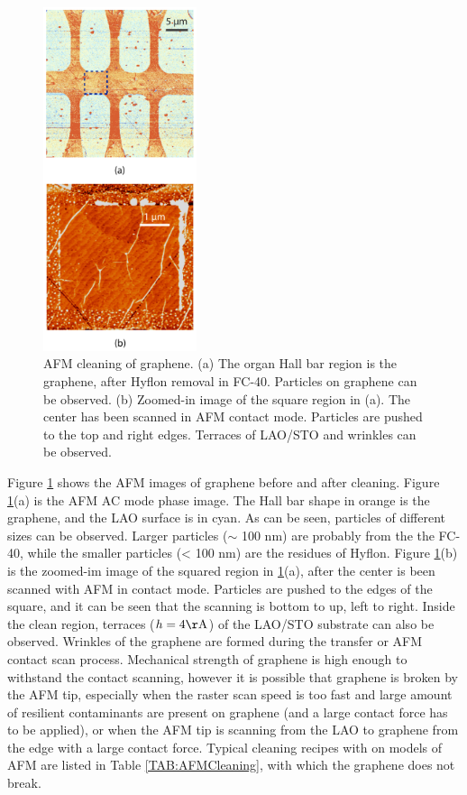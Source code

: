 \documentclass[pdflatex, sectionletters, 12pt]{pittetd}    %
\begin{document}
\begin{figure}[p]
	\centering
	\includegraphics[width=0.4\textwidth]{Drawing/GrapheneAC.pdf}
	\caption{AFM cleaning of graphene. (a) The organ Hall bar region is the graphene, after Hyflon removal in FC-40. Particles on graphene can be observed. (b) Zoomed-in image of the square region in (a). The center has been scanned in AFM contact mode. Particles are pushed to the top and right edges. Terraces of LAO/STO and wrinkles can be observed.}
	\label{FIG:GrapheneAC}
\end{figure}

Figure \ref{FIG:GrapheneAC} shows the AFM images of graphene before and after cleaning. Figure \ref{FIG:GrapheneAC}(a) is the AFM AC mode phase image. The Hall bar shape in orange is the graphene, and the LAO surface is in cyan. As can be seen, particles of different sizes can be observed. Larger particles ($\sim$ 100 nm) are probably from the the FC-40, while the smaller particles (< 100 nm) are the residues of Hyflon. Figure \ref{FIG:GrapheneAC}(b) is the zoomed-im image of the squared region in \ref{FIG:GrapheneAC}(a), after the center is been scanned with AFM in contact mode. Particles are pushed to the edges of the square, and it can be seen that the scanning is bottom to up, left to right. Inside the clean region, terraces ($h = 4 \mathrm{\AA}$) of the LAO/STO substrate can also be observed. Wrinkles of the graphene are formed during the transfer or AFM contact scan process. Mechanical strength of graphene is high enough\cite{} to withstand the contact scanning, however it is possible that graphene is broken by the AFM tip, especially when the raster scan speed is too fast and large amount of resilient contaminants are present on graphene (and a large contact force has to be applied), or when the AFM tip is scanning from the LAO to graphene from the edge with a large contact force. Typical cleaning recipes with on models of AFM are listed in Table \ref{TAB:AFMCleaning}, with which the graphene does not break.
\\
\end{document}
